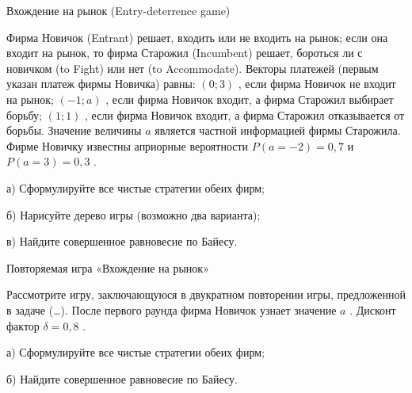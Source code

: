 \begin{problem}
 Вхождение на рынок (Entry-deterrence game)\par
Фирма Новичок (Entrant) решает, входить или не входить на рынок; если она входит на рынок, то фирма Старожил (Incumbent) решает, бороться ли с новичком (to Fight) или нет (to Accommodate). Векторы платежей (первым указан платеж фирмы Новичка) равны:
$\displaystyle \left(0;3\right)$ , если фирма Новичок не входит на рынок;
$\displaystyle \left(-1;a\right)$ , если фирма Новичок входит, а фирма Старожил выбирает борьбу;
$\displaystyle \left(1;1\right)$ , если фирма Новичок входит, а фирма Старожил отказывается от борьбы.
Значение величины  $a$  является частной информацией фирмы Старожила. Фирме Новичку известны априорные вероятности  $P\left(a=-2\right)=0,7$   и  $P\left(a=3\right)=0,3$ .\par
а) Сформулируйте все чистые стратегии обеих фирм;\par
б) Нарисуйте дерево игры (возможно два варианта);\par
в) Найдите совершенное равновесие по Байесу.\par



\begin{sol}

\end{sol}
\end{problem}



\begin{problem}
 Повторяемая игра «Вхождение на рынок»\par
Рассмотрите игру, заключающуюся в двукратном повторении игры, предложенной в задаче (\ldots ). После первого раунда фирма Новичок узнает значение  $a$ .
Дисконт фактор  $\delta =0,8$ .\par
а) Сформулируйте все чистые стратегии обеих фирм;\par
б) Найдите совершенное равновесие по Байесу.\par



\begin{sol}

\end{sol}
\end{problem}



